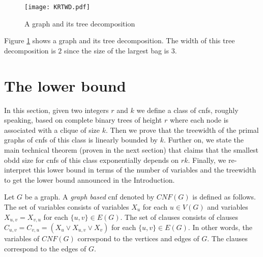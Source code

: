 \documentclass{article}
\newtheorem{theorem}{Theorem}
\begin{document}
\begin{figure} [h]
\centering
\texttt{[image: KRTWD.pdf]}
\caption{A graph and its tree decomposition}
\label{TWDPic}
\end{figure}

Figure \ref{TWDPic} shows a graph and its tree decomposition.
The width of this tree decomposition is $2$ since the size of the largest bag
is $3$.

\section{The lower bound} \label{lbmain}
\begin{comment}
\begin{theorem}
Given a parameter $k$ there is a family
$F_1, \dots, F_n, \dots$ of CNFs such that each $F_n$
has $O(nk^2)$ variables and $O(k)$ treewidth of the primal graph
and the smallest OBDD realizing each $F_n$ is of size $O(n^{k/2})$.
\end{theorem}
\end{comment}
In this section, given two integers $r$ and $k$ we define a class of {\sc cnf}s, 
roughly speaking, based on complete binary trees of height $r$ where each node is associated 
with a clique of size $k$. Then we prove that the treewidth of the primal graphs of {\sc cnf}s of this
class is linearly bounded by $k$. Further on, we state the main technical theorem (proven in the next
section) that claims that the smallest {\sc obdd} size for {\sc cnf}s of this class exponentially depends
on $rk$. Finally, we re-interpret this lower bound in terms of the number of variables and the treewidth to get
the lower bound announced in the Introduction.


Let $G$ be a graph. A \emph{graph based} {\sc cnf} denoted by $CNF(G)$ is defined as follows. 
The set of variables consists of variables $X_u$ for each $u \in V(G)$
and variables $X_{u,v}=X_{v,u}$ for each $\{u,v\} \in E(G)$. 
The set of clauses consists of clauses $C_{u,v}=C_{v,u}=(X_u \vee X_{u,v} \vee X_v)$
for each $\{u,v\} \in E(G)$. In other words, the variables of $CNF(G)$ correspond to the vertices
and edges of $G$. The clauses correspond to the edges of $G$. 

\begin{comment}
\footnote{In other words, each edge corresponds
to exactly one variable for which the order of indices in the subscript does not matter. 
The same is true regarding the clauses.}.
\end{comment}
\end{document}

